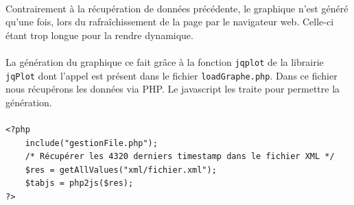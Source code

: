 \documentclass[a4paper, titlepage, oneside, 12pt]{article}%
\begin{document}
\paragraph{}
Contrairement à la récupération de données précédente, le graphique n'est généré qu'une fois, lors du rafraîchissement de la page par le navigateur web. Celle-ci étant trop longue pour la rendre dynamique.
\paragraph{}
La génération du graphique ce fait grâce à la fonction \texttt{jqplot} de la librairie \texttt{jqPlot} dont l'appel est présent dans le fichier \texttt{loadGraphe.php}.
Dans ce fichier nous récupérons les données via PHP. Le javascript les traite pour permettre la génération.
\paragraph{}
\begin{lstlisting}
<?php 
	include("gestionFile.php"); 
	/* Récupérer les 4320 derniers timestamp dans le fichier XML */
	$res = getAllValues("xml/fichier.xml");
	$tabjs = php2js($res);
?>
\end{lstlisting}
\paragraph{}
\end{document}
